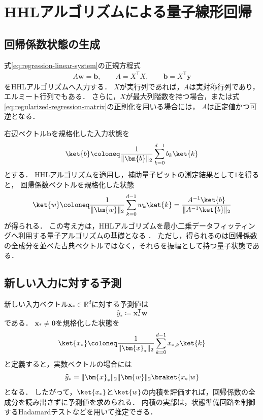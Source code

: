 \section{HHLアルゴリズムによる量子線形回帰}
\label{sec:hhl-quantum-linear-regression}

\subsection{回帰係数状態の生成}
\label{subsec:regression-coefficient-state}

式\eqref{eq:regression-linear-system}の正規方程式
\begin{align*}
  A\bm{w}=\bm{b},
  \qquad
  A=X^{\mathsf{T}}X,
  \qquad
  \bm{b}=X^{\mathsf{T}}\bm{y}
\end{align*}
をHHLアルゴリズムへ入力する．
$X$が実行列であれば，$A$は実対称行列であり，エルミート行列でもある．
さらに，$X$が最大列階数を持つ場合，または式\eqref{eq:regularized-regression-matrix}の正則化を用いる場合には，
$A$は正定値かつ可逆となる．

右辺ベクトル$\bm{b}$を規格化した入力状態を
\begin{equation}
  \ket{b}
  \coloneq
  \frac{1}{\|\bm{b}\|_2}
  \sum_{k=0}^{d-1}b_k\ket{k}
  \label{eq:regression-b-state}
\end{equation}
とする．
HHLアルゴリズムを適用し，補助量子ビットの測定結果として$1$を得ると，
回帰係数ベクトルを規格化した状態
\begin{equation}
  \ket{w}
  \coloneq
  \frac{1}{\|\bm{w}\|_2}
  \sum_{k=0}^{d-1}w_k\ket{k}
  =
  \frac{A^{-1}\ket{b}}{\|A^{-1}\ket{b}\|_2}
  \label{eq:regression-coefficient-quantum-state}
\end{equation}
が得られる．
この考え方は，HHLアルゴリズムを最小二乗データフィッティングへ利用する量子アルゴリズムの基礎となる
\cite{wiebe2012}．
ただし，得られるのは回帰係数の全成分を並べた古典ベクトルではなく，それらを振幅として持つ量子状態である．

\subsection{新しい入力に対する予測}
\label{subsec:prediction-from-coefficient-state}

新しい入力ベクトル$\bm{x}_{*}\in\mathbb{R}^{d}$に対する予測値は
\begin{equation}
  \widehat{y}_{*}
  \coloneq
  \bm{x}_{*}^{\mathsf{T}}\bm{w}
  \label{eq:new-data-prediction}
\end{equation}
である．
$\bm{x}_{*}\neq\bm{0}$を規格化した状態を
\begin{equation}
  \ket{x_{*}}
  \coloneq
  \frac{1}{\|\bm{x}_{*}\|_2}
  \sum_{k=0}^{d-1}x_{*,k}\ket{k}
  \label{eq:new-input-state}
\end{equation}
と定義すると，実数ベクトルの場合には
\begin{equation}
  \widehat{y}_{*}
  =
  \|\bm{x}_{*}\|_2\|\bm{w}\|_2
  \braket{x_{*}|w}
  \label{eq:prediction-as-overlap}
\end{equation}
となる．
したがって，$\ket{x_{*}}$と$\ket{w}$の内積を評価すれば，回帰係数の全成分を読み出さずに予測値を求められる．
内積の実部は，状態準備回路を制御するHadamardテストなどを用いて推定できる．

